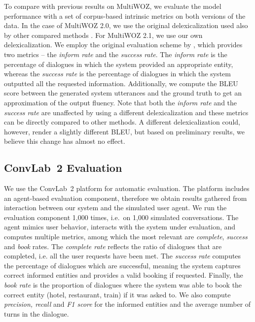 \documentclass[11pt,a4paper]{article}
\begin{document}
To compare with previous results on MultiWOZ, we evaluate the model performance with a set of corpus-based intrinsic metrics on both versions of the data.
In the case of MultiWOZ 2.0, we use the original delexicalization used also by other compared methods \cite{peng2020,hosseini2020,zhang2019}. For MultiWOZ 2.1, we use our own delexicalization.
We employ the original evaluation scheme by \citet{budzianowski2018}, which provides two metrics -- the \emph{inform rate} and the \emph{success rate}. The \emph{inform rate} is the percentage of dialogues in which the system provided an appropriate entity, whereas the \emph{success rate} is the percentage of dialogues in which the system outputted all the requested information. Additionally, we compute the BLEU score \cite{papineni2002} between the generated system utterances and the ground truth to get an approximation of the output fluency.
Note that both the \emph{inform rate} and the \emph{success rate} are unaffected by using a different delexicalization and these metrics can be directly compared to other methods. A different delexicalization could, however, render a slightly different BLEU, but based on preliminary results, we believe this change has almost no effect.


\subsection{ConvLab~2 Evaluation}
\label{sec:convlab-eval}

We use the ConvLab~2 platform \cite{zhu2020} for automatic evaluation.
The platform includes an agent-based evaluation component, therefore we obtain results gathered from interaction between our system and the simulated user agent.
We run the evaluation component 1,000 times, i.e.\ on 1,000 simulated conversations.
The agent mimics user behavior, interacts with the system under evaluation, and computes multiple metrics, among which the most relevant are \emph{complete}, \emph{success} and \emph{book} rates.
The \emph{complete rate} reflects the ratio of dialogues that are completed, i.e. all the user requests have been met.
The \emph{success rate} computes the percentage of dialogues which are successful, meaning the system captures correct informed entities and provides a valid booking if requested.
Finally, the \emph{book rate} is the proportion of dialogues where the system was able to book the correct entity (hotel, restaurant, train) if it was asked to.
We also compute \emph{precision, recall} and \emph{F1 score} for the informed entities and the average number of turns in the dialogue.
\end{document}
